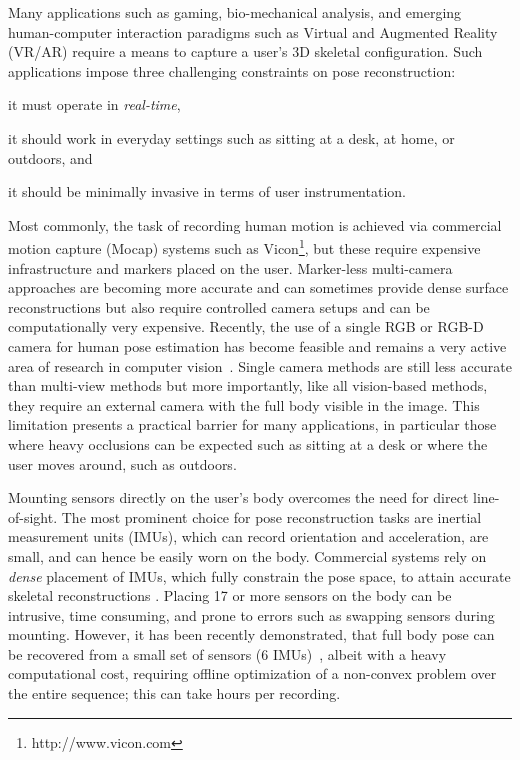 \documentclass[acmtog]{acmart}
\begin{document}
\maketitle

Many applications such as gaming, bio-mechanical analysis, and emerging human-computer interaction paradigms such as Virtual and Augmented Reality (VR/AR) require a means to capture a user's 3D skeletal configuration. 
Such applications impose three challenging constraints on pose reconstruction: 
\begin{inparaenum}[(i)]
\item it must operate in \emph{real-time},
\item it should work in everyday settings such as sitting at a desk, at home, or outdoors, and
\item it should be minimally invasive in terms of user instrumentation.
\end{inparaenum}

Most commonly, the task of recording human motion is achieved via commercial motion capture (Mocap) systems such as Vicon\footnote{http://www.vicon.com}, but these require expensive infrastructure and markers placed on the user. Marker-less multi-camera approaches are becoming more accurate and can sometimes provide dense surface reconstructions but also require controlled camera setups and can be computationally very expensive. Recently, the use of a single RGB or RGB-D camera for human pose estimation has become feasible and remains a very active area of research in computer vision~\cite{mehta2018multiperson,Kanazawa:CVPR:2018,omran2018NBF,alldieck2018video,DoubleFusion2018}. Single camera methods are still less accurate than multi-view methods but more importantly, like all vision-based methods, they require an external camera with the full body visible in the image. This limitation presents a practical barrier for many applications, in particular those where heavy occlusions can be expected such as sitting at a desk or where the user moves around, such as outdoors. 

Mounting sensors directly on the user's body overcomes the need for direct line-of-sight. The most prominent choice for pose reconstruction tasks are inertial measurement units (IMUs), which can record orientation and acceleration, are small, and can hence be easily worn on the body. Commercial systems rely on \emph{dense} placement of IMUs, which fully constrain the pose space, to attain accurate skeletal reconstructions \cite{roetenberg2007moven}. Placing 17 or more sensors on the body can be intrusive, time consuming, and prone to errors such as swapping sensors during mounting. However, it has been recently demonstrated, that full body pose can be recovered from a small set of sensors (6 IMUs)~\cite{von2017sparse}, albeit with a heavy computational cost, requiring offline optimization of a non-convex problem over the entire sequence; this can take hours per recording.  
\end{document}
